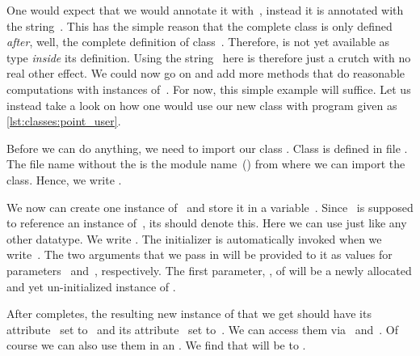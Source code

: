 One would expect that we would annotate it with~, instead it is annotated with the string~.
This has the simple reason that the complete class  is only defined \emph{after}, well, the complete definition of class~.
Therefore,  is not yet available as type \emph{inside} its definition.
Using the string~ here is therefore just a crutch with no real other effect.
%
%
%
%
%
We could now go on and add more methods that do reasonable computations with instances of~.
For now, this simple example will suffice.
Let us instead take a look on how one would use our new class with program  given as \cref{lst:classes:point_user}.

Before we can do anything, we need to import our class .
Class  is defined in file .
The file name without the  is the module name~() from where we can import the class.
Hence, we write .

We now can create one instance of~ and store it in a variable~.
Since~ is supposed to reference an instance of~, its  should denote this.
Here we can use  just like any other datatype.
We write .
The initializer  is automatically invoked when we write~.
The two arguments that we pass in will be provided to it as values for parameters~ and~, respectively.
The first parameter, , of  will be a newly allocated and yet un-initialized instance of .

After  completes, the resulting new instance of  that we get should have its attribute~ set to~ and its attribute~ set to~.
We can access them via~ and~.
Of course we can also use them in an .
We find that  will be  to .

